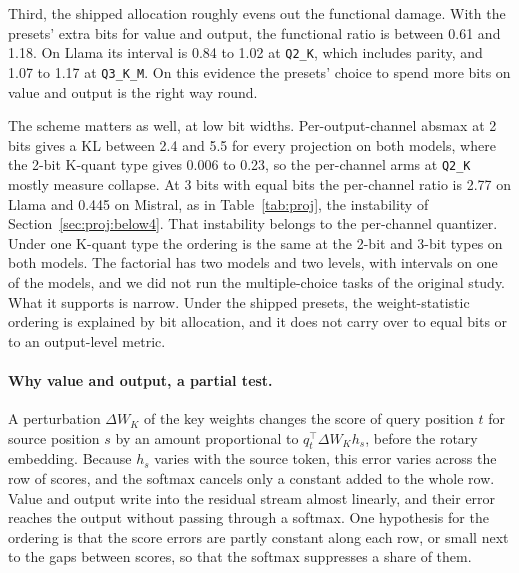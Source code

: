 \documentclass[10pt]{article}
\begin{document}
Third, the shipped allocation roughly evens out the functional damage. With the presets' extra
bits for value and output, the functional ratio is between 0.61 and 1.18. On Llama its interval
is 0.84 to 1.02 at \texttt{Q2\_K}, which includes parity, and 1.07 to 1.17 at \texttt{Q3\_K\_M}.
On this evidence the
presets' choice to spend more bits on value and output is the right way round.

The scheme matters as well, at low bit widths. Per-output-channel absmax at 2 bits gives a KL
between 2.4 and 5.5 for every projection on both models, where the 2-bit K-quant type gives 0.006
to 0.23, so the per-channel arms at \texttt{Q2\_K} mostly measure collapse. At 3 bits with equal
bits the per-channel ratio is 2.77 on Llama and 0.445 on Mistral, as in
Table~\ref{tab:proj}, the instability of Section~\ref{sec:proj:below4}. That instability
belongs to the per-channel quantizer. Under one K-quant type the ordering is the same at the
2-bit and 3-bit types on both models. The factorial has two models and two
levels, with intervals on one of the models, and we did not run the multiple-choice tasks of the original study. What
it supports is narrow. Under the shipped presets, the weight-statistic ordering is explained by
bit allocation, and it does not carry over to equal bits or to an output-level metric.

\paragraph{Why value and output, a partial test.} A perturbation $\Delta W_K$ of the key weights
changes the score of query position $t$ for source position $s$ by an amount proportional to
$q_t^\top \Delta W_K h_s$, before the rotary embedding. Because $h_s$ varies with the source
token, this error varies across the row of scores, and the softmax cancels only a constant
added to the whole row. Value and output write into the residual stream almost linearly, and
their error reaches the output without passing through a softmax. One hypothesis for the
ordering is that the score errors are partly constant along each row, or small next to the gaps
between scores, so that the softmax suppresses a share of them.
\end{document}
